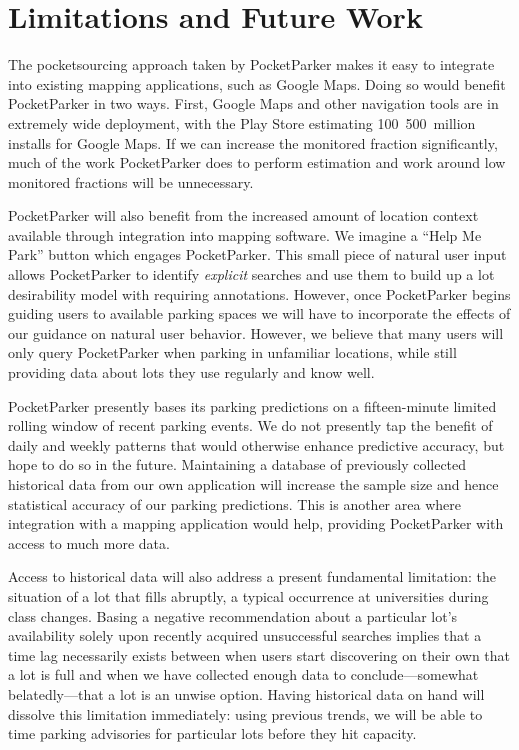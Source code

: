 \section{Limitations and Future Work}
\label{sec-future}

The pocketsourcing approach taken by PocketParker makes it easy to integrate
into existing mapping applications, such as Google Maps. Doing so would
benefit PocketParker in two ways. First, Google Maps and other navigation
tools are in extremely wide deployment, with the Play Store estimating
100~500~million installs for Google Maps. If we can increase the monitored
fraction significantly, much of the work PocketParker does to perform
estimation and work around low monitored fractions will be unnecessary.

PocketParker will also benefit from the increased amount of location context
available through integration into mapping software. We imagine a ``Help Me
Park'' button which engages PocketParker. This small piece of natural user
input allows PocketParker to identify \textit{explicit} searches and use them
to build up a lot desirability model with requiring annotations. However,
once PocketParker begins guiding users to available parking spaces we will
have to incorporate the effects of our guidance on natural user behavior.
However, we believe that many users will only query PocketParker when parking
in unfamiliar locations, while still providing data about lots they use
regularly and know well.

PocketParker presently bases its parking predictions on a fifteen-minute
limited rolling window of recent parking events. We do not presently tap the
benefit of daily and weekly patterns that would otherwise enhance predictive
accuracy, but hope to do so in the future. Maintaining a database of
previously collected historical data from our own application will increase
the sample size and hence statistical accuracy of our parking predictions.
This is another area where integration with a mapping application would help,
providing PocketParker with access to much more data.

Access to historical data will also address a present fundamental limitation:
the situation of a lot that fills abruptly, a typical occurrence at
universities during class changes. Basing a negative recommendation about a
particular lot's availability solely upon recently acquired unsuccessful
searches implies that a time lag necessarily exists between when users start
discovering on their own that a lot is full and when we have collected enough
data to conclude---somewhat belatedly---that a lot is an unwise option.
Having historical data on hand will dissolve this limitation immediately:
using previous trends, we will be able to time parking advisories for
particular lots before they hit capacity.

